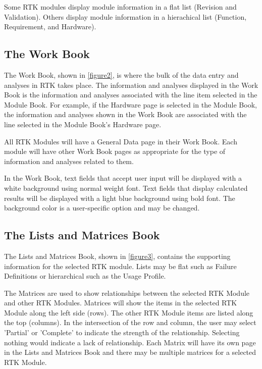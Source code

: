 \documentclass[twoside,12pt,letterpaper,openright]{book}
\begin{document}
\noindent Some RTK modules display module information in a flat list (Revision
and Validation).  Others display module information in a hierachical list 
(Function, Requirement, and Hardware).

\subsection{The Work Book}

\noindent The Work Book, shown in \ref{figure2}, is where the bulk of the data
entry and analyses in RTK takes place.  The information and analyses displayed 
in the Work Book is the information and analyses associated with the line item 
selected in the Module Book.  For example, if the Hardware page is selected in 
the Module Book, the information and analyses shown in the Work Book are 
associated with the line selected in the Module Book's Hardware page.

\noindent All RTK Modules will have a General Data page in their Work Book.  
Each module will have other Work Book pages as appropriate for the type of 
information and analyses related to them.  

\noindent In the Work Book, text fields that accept user input will be 
displayed with a white background using normal weight font.  Text fields that
display calculated results will be displayed with a light blue background using
bold font.  The background color is a user-specific option and may be changed.

\subsection{The Lists and Matrices Book}

\noindent The Lists and Matrices Book, shown in \ref{figure3}, contains the 
supporting information for the selected RTK module.  Lists may be flat such as
Failure Definitions or hierarchical such as the Usage Profile.

\noindent The Matrices are used to show relationships between the selected RTK
Module and other RTK Modules.  Matrices will show the items in the selected RTK
Module along the left side (rows).  The other RTK Module items are listed along
the top (columns).  In the intersection of the row and column, the user may
select 'Partial' or 'Complete' to indicate the strength of the relationship.
Selecting nothing would indicate a lack of relationship.  Each Matrix will have
its own page in the Lists and Matrices Book and there may be multiple matrices
for a selected RTK Module.
\end{document}
